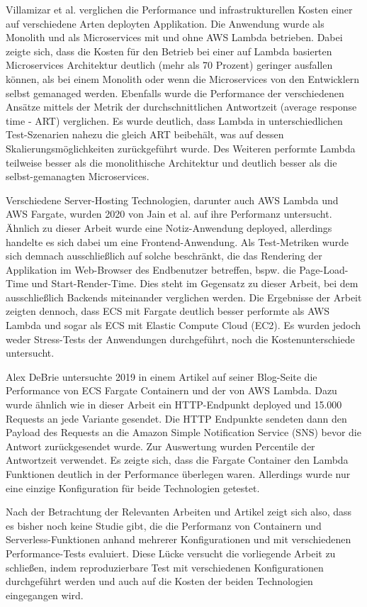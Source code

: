 Villamizar et al. verglichen die Performance und infrastrukturellen Kosten einer auf verschiedene Arten deployten Applikation\cite{villamizar_infrastructure_2016}. Die Anwendung wurde als Monolith und als Microservices mit und ohne AWS Lambda betrieben. Dabei zeigte sich,  dass die Kosten für den Betrieb bei einer auf Lambda basierten Microservices Architektur deutlich (mehr als 70 Prozent) geringer ausfallen können, als bei einem Monolith oder wenn die Microservices von den Entwicklern selbst gemanaged werden. Ebenfalls wurde die Performance der verschiedenen Ansätze mittels der Metrik der durchschnittlichen Antwortzeit (average response time - ART) verglichen. Es wurde deutlich, dass Lambda in unterschiedlichen Test-Szenarien nahezu die gleich ART beibehält, was auf dessen Skalierungsmöglichkeiten zurückgeführt wurde. Des Weiteren performte Lambda teilweise besser als die monolithische Architektur und deutlich besser als die selbst-gemanagten Microservices.

Verschiedene Server-Hosting Technologien, darunter auch AWS Lambda und AWS Fargate, wurden 2020 von Jain et al. auf ihre Performanz untersucht. Ähnlich zu dieser Arbeit wurde eine Notiz-Anwendung deployed, allerdings handelte es sich dabei um eine Frontend-Anwendung. Als Test-Metriken wurde sich demnach ausschließlich auf solche beschränkt, die das Rendering der Applikation im Web-Browser des Endbenutzer betreffen, bspw. die Page-Load-Time und Start-Render-Time. Dies steht im Gegensatz zu dieser Arbeit, bei dem ausschließlich Backends miteinander verglichen werden. Die Ergebnisse der Arbeit zeigten dennoch, dass ECS mit Fargate deutlich besser performte als AWS Lambda und sogar als ECS mit Elastic Compute Cloud (EC2). Es wurden jedoch weder Stress-Tests der Anwendungen durchgeführt, noch die Kostenunterschiede untersucht.

Alex DeBrie untersuchte 2019 in einem Artikel auf seiner Blog-Seite die Performance von ECS Fargate Containern und der von AWS Lambda\cite{debrie_aws_2019}. Dazu wurde ähnlich wie in dieser Arbeit ein HTTP-Endpunkt deployed und 15.000 Requests an jede Variante gesendet. Die HTTP Endpunkte sendeten dann den Payload des Requests an die Amazon Simple Notification Service (SNS) bevor die Antwort zurückgesendet wurde. Zur Auswertung wurden Percentile der Antwortzeit verwendet. Es zeigte sich, dass die Fargate Container den Lambda Funktionen deutlich in der Performance überlegen waren. Allerdings wurde nur eine einzige Konfiguration für beide Technologien getestet.

Nach der Betrachtung der Relevanten Arbeiten und Artikel zeigt sich also, dass es bisher noch keine Studie gibt, die die Performanz von Containern und Serverless-Funktionen anhand mehrerer Konfigurationen und mit verschiedenen Performance-Tests evaluiert. Diese Lücke versucht die vorliegende Arbeit zu schließen, indem reproduzierbare Test mit verschiedenen Konfigurationen durchgeführt werden und auch auf die Kosten der beiden Technologien eingegangen wird.